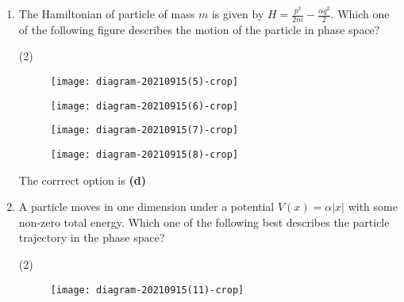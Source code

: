 \begin{enumerate}
	\item The Hamiltonian of particle of mass $m$ is given by $H=\frac{p^{2}}{2 m}-\frac{\alpha q^{2}}{2}$. Which one of the following figure describes the motion of the particle in phase space?
	{}
\begin{tasks}(2)
	\task[\textbf{A.}]\begin{figure}[H]
		\centering
		\texttt{[image: diagram-20210915(5)-crop]}
	\end{figure}
	\task[\textbf{B.}]\begin{figure}[H]
		\centering
		\texttt{[image: diagram-20210915(6)-crop]}
	\end{figure}
	\task[\textbf{C.}]\begin{figure}[H]
		\centering
		\texttt{[image: diagram-20210915(7)-crop]}
	\end{figure}
	\task[\textbf{D.}]\begin{figure}[H]
		\centering
		\texttt{[image: diagram-20210915(8)-crop]}
	\end{figure}
\end{tasks}
\begin{answer}
	The corrrect option is \textbf{(d)}
\end{answer}
	\item A particle moves in one dimension under a potential $V(x)=\alpha|x|$ with some non-zero total energy. Which one of the following best describes the particle trajectory in the phase space?
	{}
\begin{tasks}(2)
	\task[\textbf{A.}]\begin{figure}[H]
		\centering
		\texttt{[image: diagram-20210915(11)-crop]}
	

\end{figure}
\end{tasks}
\end{enumerate}
